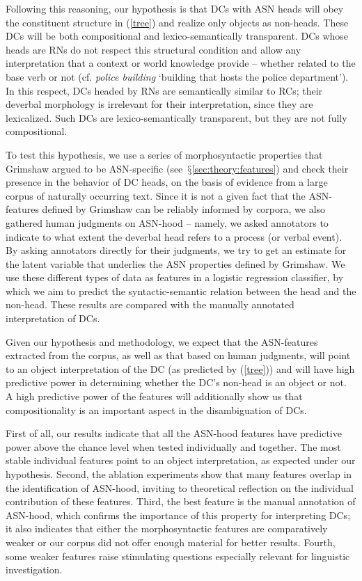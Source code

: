 \documentclass[output=paper]{langsci/langscibook}
\begin{document}
 Following this reasoning, our hypothesis is that DCs with ASN heads will obey the constituent structure  in (\ref{tree}) and realize only objects as non-heads. These DCs will be both compositional  and lexico-semantically transparent. DCs whose heads are RNs  do not respect this structural condition and allow any interpretation that a context  or world knowledge provide -- whether related to the base verb or not  (cf. \textit{police building} \lq building that hosts the police department\rq). In this respect, DCs headed by RNs are semantically similar to RCs; their deverbal morphology is irrelevant for their interpretation, since they are lexicalized.  Such DCs are lexico-semantically transparent, but they are not fully compositional.


To test this hypothesis, we  use a series of morphosyntactic properties that Grimshaw argued to be ASN-specific (see~$§$\ref{sec:theory:features})  and check their presence in the behavior of DC heads, on the basis of evidence from a large corpus of naturally occurring text.   Since it is not a given fact that the ASN-features defined by Grimshaw can be reliably informed by corpora, we also gathered human judgments on ASN-hood -- namely, we asked annotators to indicate to what extent the deverbal head refers to a process (or verbal event). By asking annotators directly for their judgments, we try to get an estimate for the latent variable that underlies the ASN properties defined by Grimshaw. We use these different types of data as features in a logistic regression classifier, by which we aim to predict the syntactic-semantic relation between the head and the non-head.  These results are compared with the manually annotated interpretation of DCs. 
 

Given our hypothesis and methodology, we expect that the ASN-features extracted from the corpus, as well as that based on human judgments, will point to an object interpretation of the DC (as predicted by  (\ref{tree})) and will have high predictive power in determining whether the DC's non-head is an object or not. A high predictive power of the features will additionally show us that compositionality is an important aspect in the disambiguation of DCs.

First of all, our results indicate that all the ASN-hood features have predictive power above the chance level when tested individually and  together. The most stable individual features point to an object interpretation, as expected under our hypothesis. Second, the ablation experiments  show that many features overlap in the identification of ASN-hood, inviting to theoretical reflection on  the individual contribution of these features. Third, the best feature is the manual annotation of ASN-hood,  which confirms the importance of this property for interpreting DCs;  it also indicates that either the morphosyntactic features are comparatively weaker or our corpus did not offer enough material for better results. Fourth, some weaker features raise stimulating questions especially relevant for linguistic investigation.
\end{document}
